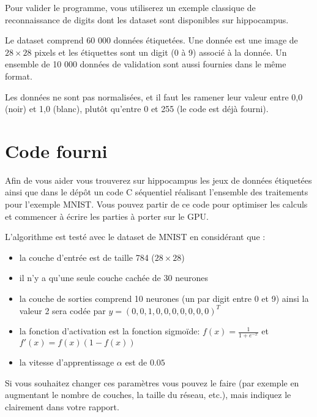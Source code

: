 \documentclass[11pt]{paper}
\begin{document}
Pour valider le programme, vous utiliserez un exemple classique de reconnaissance de digits dont les dataset sont disponibles sur hippocampus.

Le dataset comprend 60 000 données étiquetées. Une donnée est une image de $28\times28$ pixels et les étiquettes sont un digit (0 à 9) associé à la donnée. Un ensemble de 10 000 données de validation sont aussi fournies dans le même format.

Les données ne sont pas normalisées, et il faut les ramener leur valeur entre 0,0 (noir) et 1,0 (blanc), plutôt qu'entre 0 et 255 (le code est déjà fourni).


  \section*{Code fourni}

Afin de vous aider vous trouverez sur hippocampus les jeux de données étiquetées ainsi que dans le dépôt un code C séquentiel réalisant l'ensemble des traitements pour l'exemple MNIST. Vous pouvez partir de ce code pour optimiser les calculs et commencer à écrire les parties à porter sur le GPU.
\medskip

L'algorithme est testé avec le dataset de MNIST en considérant que :
\begin{itemize}
	\item la couche d'entrée est de taille 784 ($28\times28$)
	\item il n'y a qu'une seule couche cachée de 30 neurones
	\item la couche de sorties comprend 10 neurones (un par digit entre 0 et 9) ainsi la valeur 2 sera codée par $y = (0,0,1,0,0,0,0,0,0,0)^T$
	\item la fonction d'activation est la fonction sigmoïde: $f(x) = \frac{1}{1+e^{-x}}$  et $f'(x) = f(x)(1-f(x))$ 
	\item la vitesse d'apprentissage $\alpha$ est de $0.05$
\end{itemize}

Si vous souhaitez changer ces paramètres vous pouvez le faire (par exemple en augmentant le nombre de couches, la taille du réseau, etc.), mais indiquez le clairement dans votre rapport.
\end{document}
